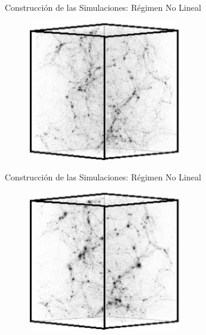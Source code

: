 \documentclass[8pt,fleqn]{beamer}
\begin{document}
\begin{frame}
\begin{block}{Construcción de las Simulaciones: Régimen No Lineal}\justifying

\begin{figure}[htbp]
	\centering
	\includegraphics[trim = 0mm 0mm 0mm 0mm, clip, width=0.6\textwidth]
	{./figures/Nonlinear3.png}
\end{figure}

\end{block}
\end{frame}
\begin{frame}
\begin{block}{Construcción de las Simulaciones: Régimen No Lineal}\justifying

\begin{figure}[htbp]
	\centering
	\includegraphics[trim = 0mm 0mm 0mm 0mm, clip, width=0.6\textwidth]
	{./figures/Nonlinear4.png}
\end{figure}

\end{block}
\end{frame}
\end{document}
